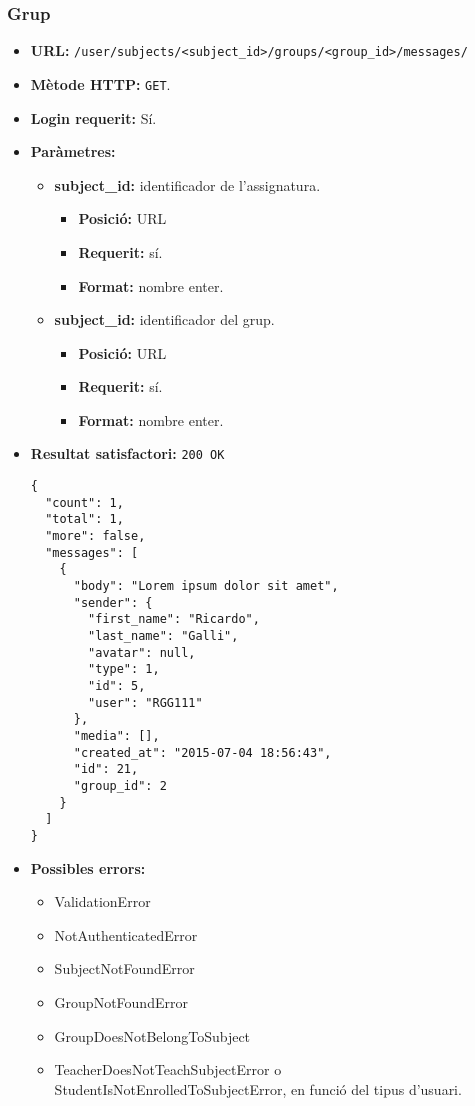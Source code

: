 	\subsubsection{Grup}
	\begin{itemize}
	\item \textbf{\ac{URL}:} \texttt{/user/subjects/<subject\_id>/groups/<group\_id>/messages/}
	\item \textbf{Mètode \ac{HTTP}: } \texttt{GET}.
	\item \textbf{Login requerit:} Sí.
	\item \textbf{Paràmetres:}
	\begin{itemize}
		\item \textbf{subject\_id:} identificador de l'assignatura.
		\begin{itemize}
			\item \textbf{Posició:} \ac{URL}
			\item \textbf{Requerit:} sí.
			\item \textbf{Format:} nombre enter.
		\end{itemize}
		\item \textbf{subject\_id:} identificador del grup.
		\begin{itemize}
			\item \textbf{Posició:} \ac{URL}
			\item \textbf{Requerit:} sí.
			\item \textbf{Format:} nombre enter.
		\end{itemize}

	\end{itemize}
	\item \textbf{Resultat satisfactori:} \texttt{200 OK}
	\begin{verbatim}
{
  "count": 1,
  "total": 1,
  "more": false,
  "messages": [
    {
      "body": "Lorem ipsum dolor sit amet",
      "sender": {
        "first_name": "Ricardo",
        "last_name": "Galli",
        "avatar": null,
        "type": 1,
        "id": 5,
        "user": "RGG111"
      },
      "media": [],
      "created_at": "2015-07-04 18:56:43",
      "id": 21,
      "group_id": 2
    }
  ]
}
	\end{verbatim}
	\item \textbf{Possibles errors:}
	\begin{itemize}
		\item ValidationError
		\item NotAuthenticatedError
		\item SubjectNotFoundError
		\item GroupNotFoundError
		\item GroupDoesNotBelongToSubject
		\item TeacherDoesNotTeachSubjectError o StudentIsNotEnrolledToSubjectError, en funció del tipus d'usuari.
	\end{itemize}
	\end{itemize}
	

